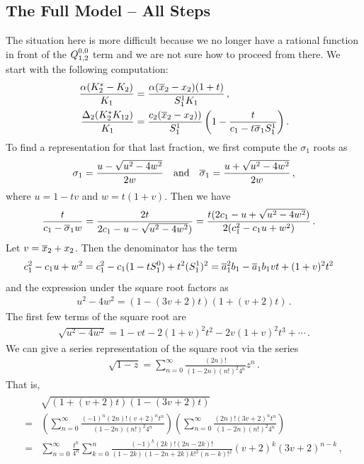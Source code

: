 \subsection{The Full Model -- All Steps}
The situation here is more difficult because we no longer have a rational function in front of the $Q_{1,2}^{0,0}$ term and we are not sure how to proceed from there. We start with the following computation:
\begin{align}
	\frac{\alpha(K_2^\ast -K_2)}{K_1}  &= \frac{\alpha (\overline{x}_2 - x_2)(1 + t)}{S_1^1K_1}\,,\\
	\frac{\Delta_2(K_2^\ast K_{12})}{K_1} &=\frac{c_2(\overline{x}_2-x_2))}{S_1^1}\left(1-\frac{t}{c_1-t\overline{\sigma}_1S_1^1}\right).
\end{align}
To find a representation for that last fraction, we first compute the $\sigma_1$ roots as
\begin{align}
	\sigma_1 = \frac{u-\sqrt{u^2-4w^2}}{2w} \quad\text{and}\quad \overline{\sigma}_1 = \frac{u + \sqrt{u^2-4w^2}}{2w}\,,
\end{align}
where $u = 1-tv$ and $w = t(1 + v)$. Then we have
\begin{align}
		\frac{t}{c_1-\overline{\sigma}_1w} &= \frac{2t}{2c_1-u-\sqrt{u^2-4w^2})}  = \frac{t(2c_1-u + \sqrt{u^2-4w^2})}{2(c_1^2-c_1u + w^2)}\,.
\end{align}
Let $v = \overline{x}_2 + x_2$. Then the denominator has the term
\begin{align}
	c_1^2-c_1u + w^2 &= c_1^2-c_1(1-t S_1^0) + t^2(S_1^1)^2=\overline{a}_1^2b_1 - \overline{a}_1b_1vt + (1 + v)^2 t^2
\end{align}
and the expression under the square root factors as
\begin{align}
	u^2-4w^2 = (1-(3v + 2)t)(1 + (v + 2)t)\,.
\end{align}
The first few terms of the square root are
\begin{align}
	\sqrt{u^2-4w^2} = 1 - vt-2(1 + v)^2 t^2-2v(1 + v)^2t^3 + \cdots\,.
\end{align}
We can give a series representation of the square root via the series
\begin{align}
	\sqrt{1-z} = \sum_{n=0}^\infty \frac{(2n)!}{(1-2n)(n!)^2 4^n}z^n\,.
\end{align}
That is,
\begin{align}
	\begin{split}
		&\sqrt{(1 + (v + 2)t)(1-(3v + 2)t)} \\=& \left(\sum_{n=0}^\infty \frac{(-1)^n(2n)!(v + 2)^n t^n}{(1-2n)(n!)^2 4^n}\right)\left(\sum_{n=0}^\infty \frac{(2n)!(3v + 2)^nt^n}{(1-2n)(n!)^2 4^n}\right)\\
		=& \sum_{n=0}^\infty \frac{t^n}{4^n}\sum_{k=0}^n \frac{(-1)^k(2k)!(2n-2k)!}{(1-2k)(1-2n + 2k)k!^2 (n-k)!^2}(v + 2)^k(3v + 2)^{n-k}\,,
	\end{split}
\end{align}
